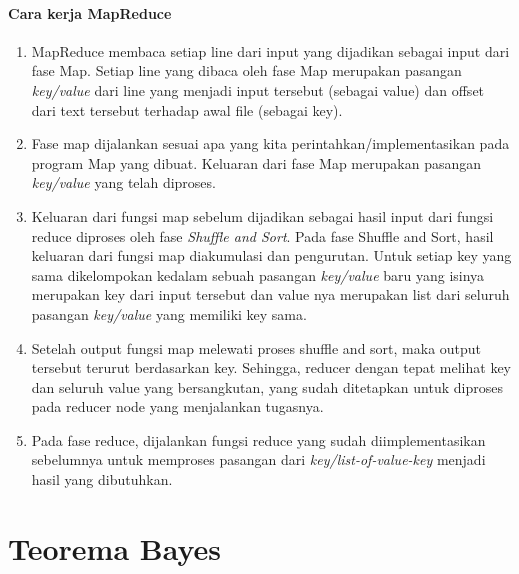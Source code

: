 \paragraph{Cara kerja MapReduce}


\begin{enumerate}
	\item MapReduce membaca setiap line dari input yang dijadikan sebagai input dari fase Map. Setiap line yang dibaca oleh fase Map merupakan pasangan \textit{key/value} dari line yang menjadi input tersebut (sebagai value) dan offset dari text tersebut terhadap awal file (sebagai key).
	\item Fase map dijalankan sesuai apa yang kita perintahkan/implementasikan pada program Map yang dibuat. Keluaran dari fase Map merupakan pasangan \textit{key/value} yang telah diproses.
	\item Keluaran dari fungsi map sebelum dijadikan sebagai hasil input dari fungsi reduce diproses oleh fase \textit{Shuffle and Sort}. Pada fase Shuffle and Sort, hasil keluaran dari fungsi map diakumulasi dan pengurutan. Untuk setiap key yang sama dikelompokan kedalam sebuah pasangan \textit{key/value} baru yang isinya merupakan key dari input tersebut dan value nya merupakan list dari seluruh pasangan \textit{key/value} yang memiliki key sama.
	\item Setelah output fungsi map melewati proses shuffle and sort, maka output tersebut terurut berdasarkan key. Sehingga, reducer dengan tepat melihat key dan seluruh value yang bersangkutan, yang sudah ditetapkan untuk diproses pada reducer node yang menjalankan tugasnya.
	\item Pada fase reduce, dijalankan fungsi reduce yang sudah diimplementasikan sebelumnya untuk memproses pasangan dari \textit{key/list-of-value-key} menjadi hasil yang dibutuhkan.
\end{enumerate}

		
\section{Teorema Bayes \cite{garg2013design}}
	
